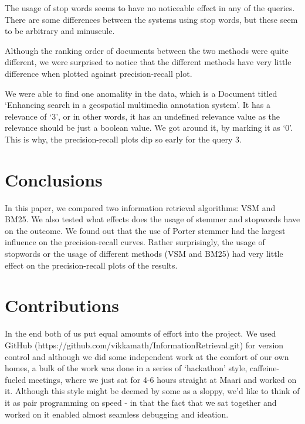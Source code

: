 The usage of stop words seems to have no noticeable effect in any of the queries. There are some differences between the systems using stop words, but these seem to be arbitrary and minuscule. 

Although the ranking order of documents between the two methods were quite different, we were surprised to notice that the different methods have very little difference when plotted against precision-recall plot.  

We were able to find one anomality in the data, which is a Document titled \lq Enhancing search in a geospatial multimedia annotation system'. It has a relevance of \lq 3', or in other words, it has an undefined relevance value as the relevance should be just a boolean value. We got around it, by marking it as \lq 0'. This is why, the precision-recall plots dip so early for the query 3.

\section{Conclusions}

In this paper, we compared two information retrieval algorithms: VSM and BM25. We also tested what effects does the usage of stemmer and stopwords have on the outcome. We found out that the use of Porter stemmer had the largest influence on the precision-recall curves. Rather surprisingly, the usage of stopwords or the usage of different methods (VSM and BM25) had very little effect on the precision-recall plots of the results. 



\section{Contributions}
In the end both of us put equal amounts of effort into the project. 
We used GitHub (https://github.com/vikkamath/InformationRetrieval.git) for version control and although we did
some independent work at the comfort of our own homes, a bulk of the work
was done in a series of \lq hackathon' style, caffeine-fueled meetings, where we just sat
for 4-6 hours straight at Maari and worked on it. Although this style might be deemed by some
as a sloppy, we'd like to think of it as pair programming on speed - in that 
the fact that we sat together and worked on it enabled almost seamless debugging
and ideation.\\


